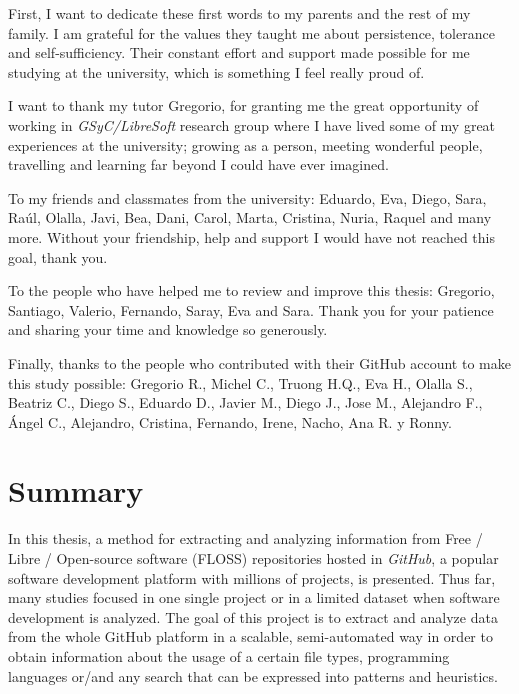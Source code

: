 \documentclass[a4paper, 12pt]{book}
\begin{document}
First, I want to dedicate these first words to my parents and the rest of my family. I am grateful for the values
they taught me about persistence, tolerance and self-sufficiency. Their constant effort and support made possible
for me studying at the university, which is something I feel really proud of.

I want to thank my tutor Gregorio, for granting me the great opportunity of working
in \emph{GSyC/LibreSoft} research group where I have lived some of my great experiences at the university;
growing as a person, meeting wonderful people, travelling and learning far beyond I could have ever imagined.

To my friends and classmates from the university: Eduardo, Eva, Diego, Sara, Raúl, Olalla, Javi, Bea, Dani, Carol, Marta,
Cristina, Nuria, Raquel and many more. Without your friendship, help and support I would have not reached this goal, thank you.

To the people who have helped me to review and improve this thesis: Gregorio, Santiago, Valerio, Fernando, Saray, Eva and Sara. Thank you
for your patience and sharing your time and knowledge so generously.

Finally, thanks to the people who contributed with their GitHub account to make this study possible:
Gregorio R., Michel C., Truong H.Q., Eva H., Olalla S., Beatriz C., Diego S.,
Eduardo D., Javier M., Diego J., Jose M., Alejandro F., Ángel C., Alejandro, Cristina, Fernando, Irene, Nacho, Ana R. y Ronny.
\chapter*{Summary}
In this thesis, a method for extracting and analyzing information from Free / Libre / Open-source
software (FLOSS) repositories hosted in \emph{GitHub}, a popular software development platform with millions of projects, is presented. Thus far, many studies focused
in one single project or in a limited dataset when software development is analyzed. The goal of this project is to
extract and analyze data from the whole GitHub platform in a scalable, semi-automated way in order to obtain information about
the usage of a certain file types, programming languages or/and any search that can be expressed into patterns and heuristics.
\end{document}
